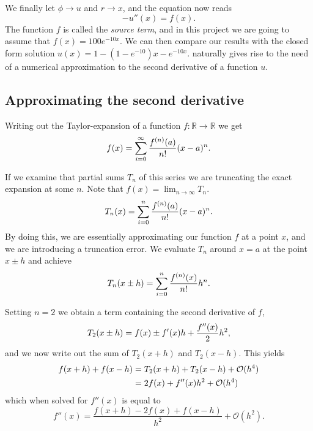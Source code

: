 \documentclass[10pt,a4paper]{amsart}
\begin{document}
  We finally let $\phi \rightarrow u$ and $r \rightarrow x$, and the equation
  now reads
  \begin{equation}
    \label{eq:diff_eq}
    -u''(x) = f(x).
  \end{equation}
  The function $f$ is called the \textit{source term}, and in this project we
  are going to assume that $f(x) = 100e^{-10x}$. We can then compare our
  results with the closed form solution $u(x) = 1 - (1-e^{-10})x -e^{-10x}$.
   naturally gives rise to the need of a numerical
  approximation to the second derivative of a function $u$.

  \subsection{Approximating the second derivative}
  \label{sub:approximating_the_second_derivative}
  
  Writing out the Taylor-expansion of a function $f : \mathbb{R} \rightarrow
  \mathbb{R} $ we get
  \begin{equation}
    \notag
    f(x) = \sum^{\infty}_{i=0} \frac{f^{(n)}(a)}{n!}(x - a)^n.
  \end{equation}

  If we examine that partial sums $T_n$ of this series we are truncating the
  exact expansion at some $n$. Note that $f(x) = \lim_{n \rightarrow \infty}
  T_n$.
  \begin{equation}
    \notag
    T_n(x) = \sum^{n}_{i=0} \frac{f^{(n)}(a)}{n!}(x-a)^n.
  \end{equation}
  By doing this, we are essentially approximating our function $f$ at a point
  $x$, and we are introducing a truncation error. We evaluate $T_n$
  around $x = a$ at the point $x \pm h$ and achieve
  \begin{equation}
    \notag
    T_n(x\pm h) = \sum^{n}_{i=0} \frac{f^{(n)}(x)}{n!}h^n.
  \end{equation}

  Setting $n = 2$ we obtain a term containing the second derivative of $f$,
  \begin{equation}
    \notag
    T_2(x \pm h) = f(x) \pm f'(x)h + \frac{f''(x)}{2}h^2,
  \end{equation}
  and we now write out the sum of $T_2(x+h)$ and $T_2(x-h)$. This yields
  \begin{align*}
    \notag
    f(x + h) + f(x-h) &= T_2(x + h) + T_2(x - h) + \mathcal{O}(h^4) \\
    &= 2f(x) + f''(x)h^2 + \mathcal{O}(h^4)
  \end{align*}
  which when solved for $f''(x)$ is equal to
  \begin{equation}
    \label{eq:diff_app}  
    f''(x) = \frac{f(x+h) - 2f(x) + f(x-h)}{h^2}  + \mathcal{O}(h^2).
  \end{equation}
\end{document}
